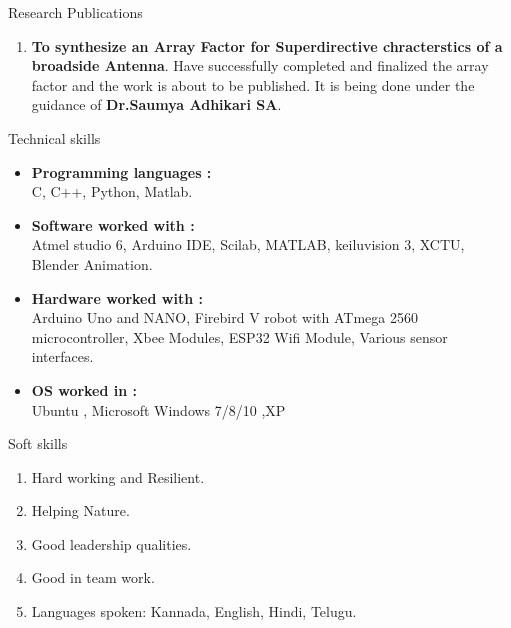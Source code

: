 \documentclass{resume} %
\begin{document}
\vskip 0.5in

\begin{rSection}{Research Publications}
\begin{enumerate}
    \item {\bf To synthesize an Array Factor for Superdirective chracterstics of a broadside Antenna}. Have successfully completed and finalized the array factor and the work is about to be published. It is being done under the guidance of {\bf Dr.Saumya Adhikari SA}.\\
\end{enumerate}
\end{rSection}

\pagebreak

\begin{rSection}{Technical skills}
\begin{itemize}
    \item {\bf Programming languages :} \\
     C, C++, Python, Matlab.
     \item {\bf Software worked with :} \\
     Atmel studio 6, Arduino IDE, Scilab, MATLAB, keiluvision 3, XCTU, Blender Animation.
     \item {\bf Hardware worked with :} \\
     Arduino Uno and NANO, Firebird V robot with ATmega 2560 microcontroller, Xbee Modules, ESP32 Wifi Module, Various sensor interfaces.
     
     \item {\bf OS worked in :} \\
     Ubuntu , Microsoft Windows 7/8/10 ,XP
\end{itemize}
\end{rSection}

\vskip 0.5in

\begin{rSection}{Soft skills}
\begin{enumerate}
    \item Hard working and Resilient.
    \item Helping Nature.
    \item Good leadership qualities.
    \item Good in team work.
    \item Languages spoken: Kannada, English, Hindi, Telugu.
\end{enumerate}
\end{rSection}

\vskip 0.5in
\end{document}
